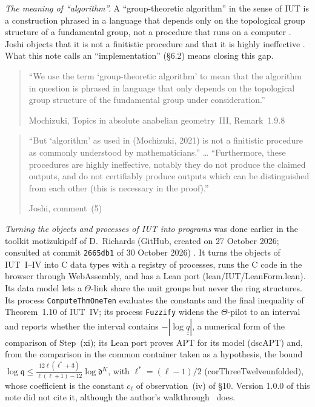 \documentclass[11pt,a4paper]{article}
\newcommand{\qq}{\underline{\underline{q}}}
\newcommand{\leanus}{\textunderscore\allowbreak}
\newcommand{\lean}[1]{{\ttfamily\let\_\leanus #1}}
\newcommand{\lab}[2]{{\upshape\fcolorbox{#1}{#1!8}{\scriptsize\sffamily\bfseries\textcolor{#1}{#2}}}}
\newcommand{\tagS}{\lab{blue}{S}}
\newcommand{\tagX}{\lab{Purple}{X}}
\newcommand{\q}[1]{``#1''}
\newcommand{\srcquote}[2]{\begin{quote}\small #1\par\nopagebreak\hfill{\footnotesize #2}\end{quote}}
\begin{document}
\tagS{} \emph{The meaning of ``algorithm''.} A ``group-theoretic algorithm'' in the sense of IUT is a construction
phrased in a language that depends only on the topological group structure of a fundamental group, not a procedure
that runs on a computer \cite{AbsTopIII}. \tagX{} Joshi objects that it is not a finitistic procedure and that it is
highly ineffective \cite{Joshi}. What this note calls an ``implementation'' (\S6.2) means closing this gap.
\srcquote{\q{We use the term `group-theoretic algorithm' to mean that the algorithm in question is phrased in
language that only depends on the topological group structure of the fundamental group under
consideration.}}{Mochizuki, Topics in absolute anabelian geometry~III, Remark~1.9.8 \cite{AbsTopIII}}
\srcquote{\q{But `algorithm' as used in (Mochizuki, 2021) is not a finitistic procedure as commonly understood by
mathematicians.} \dots{} \q{Furthermore, these procedures are highly ineffective, notably they do not produce the claimed
outputs, and do not certifiably produce outputs which can be distinguished from each other (this is necessary in the
proof).}}{Joshi, comment~(5) \cite{Joshi}}

\tagX{} \emph{Turning the objects and processes of IUT into programs} was done earlier in the toolkit motizukipdf of
D.~Richards (GitHub, created on 27 October 2026; consulted at commit \texttt{2665db1} of 30 October 2026)
\cite{Richards}. It turns the objects of IUT~I--IV into C data types with a registry of processes, runs the C code in
the browser through WebAssembly, and has a Lean port (\lean{lean/IUT/LeanForm.lean}). Its data model lets a
$\Theta$-link share the unit groups but never the ring structures. Its process \texttt{ComputeThmOneTen} evaluates the
constants and the final inequality of Theorem~1.10 of IUT~IV; its process \texttt{Fuzzify} widens the $\Theta$-pilot to
an interval and reports whether the interval contains $-|\log\qq|$, a numerical form of the comparison of Step~(xi); its
Lean port proves APT for its model (\lean{dsc\_APT}) and, from the comparison in the common container taken as a
hypothesis, the bound $\log\mathfrak q\le\frac{12\ell(\ell^*+3)}{\ell(\ell+1)-12}\log\mathfrak d^K$, with
$\ell^*=(\ell-1)/2$ (\lean{corThreeTwelve\_unfolded}), whose coefficient is the constant $c_\ell$ of observation~(iv) of
\S10. Version 1.0.0
of this note did not cite it, although the author's walkthrough~\cite{WT} does.
\end{document}
